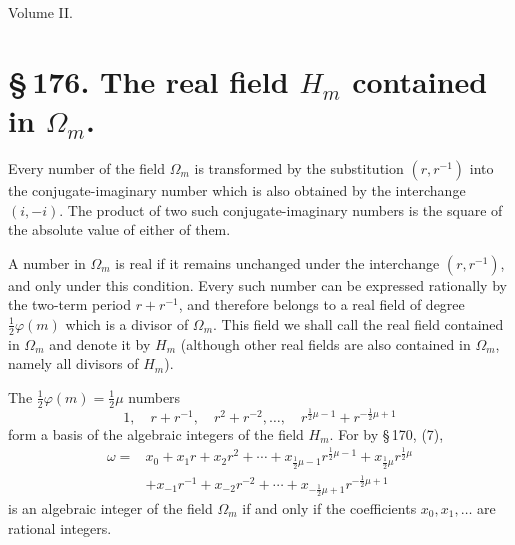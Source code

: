\documentclass[11pt]{article}
\begin{document}
\begin{center}{\large Volume II.}\end{center}
\section*{\S\,176. The real field $H_m$ contained in $\Omega_m$.}

Every number of the field $\Omega_m$ is transformed by the substitution $(r,r^{-1})$ into the conjugate-imaginary number which is also obtained by the interchange $(i,-i)$. The product of two such conjugate-imaginary numbers is the square of the absolute value of either of them.

A number in $\Omega_m$ is real if it remains unchanged under the interchange $(r,r^{-1})$, and only under this condition. Every such number can be expressed rationally by the two-term period $r+r^{-1}$, and therefore belongs to a real field of degree $\frac12\varphi(m)$ which is a divisor of $\Omega_m$. This field we shall call the real field contained in $\Omega_m$ and denote it by $H_m$ (although other real fields are also contained in $\Omega_m$, namely all divisors of $H_m$).

The $\frac12\varphi(m)=\frac12\mu$ numbers
\begin{equation}
1,\quad r+r^{-1},\quad r^2+r^{-2},\ldots,\quad r^{\frac12\mu-1}+r^{-\frac12\mu+1}
\tag{1}
\end{equation}
form a basis of the algebraic integers of the field $H_m$. For by \S\,170, (7),
\begin{equation}
\begin{aligned}
\omega={}&x_0+x_1r+x_2r^2+\cdots+x_{\frac12\mu-1}r^{\frac12\mu-1}+x_{\frac12\mu}r^{\frac12\mu} \\
&+x_{-1}r^{-1}+x_{-2}r^{-2}+\cdots+x_{-\frac12\mu+1}r^{-\frac12\mu+1}
\end{aligned}
\tag{2}
\end{equation}
is an algebraic integer of the field $\Omega_m$ if and only if the coefficients $x_0,x_1,
\ldots$ are rational integers.
\end{document}
